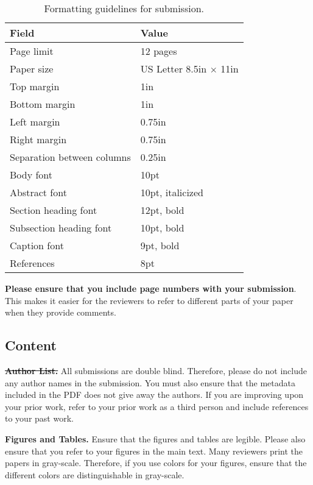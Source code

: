 \begin{table}[h!]
  \centering
  \begin{tabular}{|l|l|}
    \hline
    \textbf{Field} & \textbf{Value}\\
    \hline
    \hline
    Page limit & 12 pages\\
    \hline
    Paper size & US Letter 8.5in $\times$ 11in\\
    \hline
    Top margin & 1in\\
    \hline
    Bottom margin & 1in\\
    \hline
    Left margin & 0.75in\\
    \hline
    Right margin & 0.75in\\
    \hline
    Separation between columns & 0.25in\\
    \hline
    Body font & 10pt\\
    \hline
    Abstract font & 10pt, italicized\\
    \hline
    Section heading font & 12pt, bold\\
    \hline
    Subsection heading font & 10pt, bold\\
    \hline
    Caption font & 9pt, bold\\
    \hline
    References & 8pt\\
    \hline
  \end{tabular}
  \caption{Formatting guidelines for submission.}
  \label{table:formatting}
\end{table}

\textbf{Please ensure that you include page numbers with your
submission}. This makes it easier for the reviewers to refer to
different parts of your paper when they provide comments.

\subsection{Content}

\noindent\textbf{\sout{Author List.}} All submissions are double
blind. Therefore, please do not include any author names in the
submission. You must also ensure that the metadata included in the
PDF does not give away the authors. If you are improving upon your
prior work, refer to your prior work as a third person and include
references to your past work. 

\noindent\textbf{Figures and Tables.} Ensure that the figures and
tables are legible.  Please also ensure that you refer to your
figures in the main text. Many reviewers print the papers in
gray-scale. Therefore, if you use colors for your figures, ensure
that the different colors are distinguishable in gray-scale.

